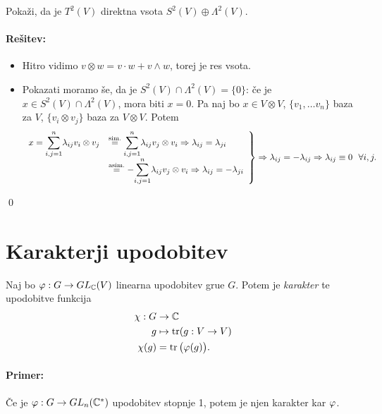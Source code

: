 \begin{zgled}
	Poka\v zi, da je $T^2(V)$ direktna vsota $S^2(V) \oplus \Lambda^2(V)$.
	
	\paragraph{Re\v sitev:}
	\begin{itemize}
		\item{Hitro vidimo $v \otimes w = v \cdot w + v \wedge w$, torej je res vsota.}
		\item{Pokazati moramo \v se, da je $S^2(V) \cap \Lambda^2(V) = \{0\}$: \v ce je $x \in S^2(V) \cap \Lambda^2 (V)$,
			mora biti $x = 0$. Pa naj bo $x \in V \otimes V$, $\{v_1, \ldots v_n\}$ baza za $V$, $\{v_i \otimes v_j\}$
			baza za $V \otimes V$. Potem
			\[
				\left.
				\begin{array}{rl}
				x = \displaystyle{\sum_{i,j = 1}^n} \lambda_{ij} v_i \otimes v_j &\stackrel{\text{sim.}}{=} 
					\displaystyle{\sum_{i,j = 1}^n} \lambda_{ij}v_j \otimes v_i \Rightarrow \lambda_{ij} =
					\lambda_{ji} \\
				&\stackrel{\text{asim.}}{=} -\displaystyle{\sum_{i,j=1}^n} \lambda_{ij} v_j \otimes v_i \Rightarrow
					\lambda_{ij} = -\lambda_{ji}
				\end{array}\right\} \Rightarrow \lambda_{ij} = -\lambda_{ij} \Rightarrow \lambda_{ij} \equiv 0\ \ \forall i,j.
			\]}
	\end{itemize}
	\qed
\end{zgled}

\section{Karakterji upodobitev}

\begin{defin}
	Naj bo $\varphi : G \to GL_{\mathbb{C}}(V)$ linearna upodobitev grue $G$. Potem je {\em karakter} te upodobitve funkcija
	\begin{align*}
		\chi : G &\to \mathbb{C} \\
		g &\mapsto \operatorname{tr} (g : V \to V) \\
		\chi(g) &= \operatorname{tr} \big(\varphi(g)\big).
	\end{align*}
\end{defin}

\paragraph{Primer:} \v Ce je $\varphi : G \to GL_n(\mathbb{C}^*)$ upodobitev stopnje 1, potem je njen karakter kar $\varphi$.


